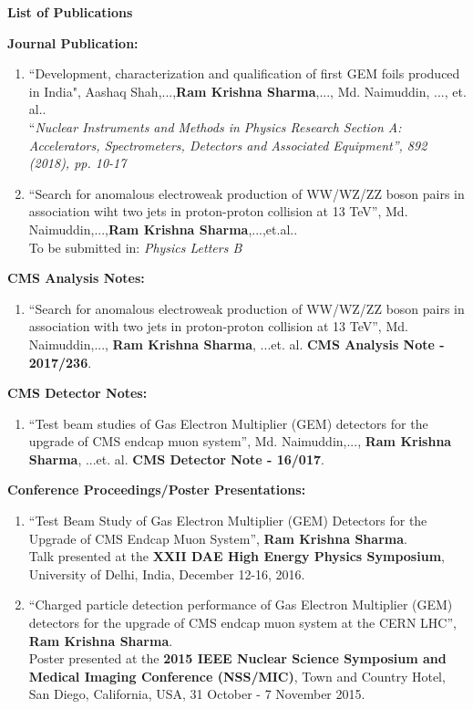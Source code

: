 \begin{center}
\doublespacing
{\LARGE \textbf{List of Publications}}
\end{center}
{\Large\textbf{Journal Publication:}}
\begin{enumerate}
\item ``Development, characterization and qualification of first GEM foils produced in India", Aashaq Shah,...,\textbf{Ram Krishna Sharma},..., Md. Naimuddin, ..., et. al..\\``\textit{Nuclear Instruments and Methods in Physics Research Section A: Accelerators, Spectrometers, Detectors and Associated Equipment'', 892 (2018), pp. 10-17}

\item ``Search for anomalous electroweak production of WW/WZ/ZZ boson pairs in association wiht two jets in proton-proton collision at 13 TeV'', Md. Naimuddin,...,\textbf{Ram Krishna Sharma},...,et.al..\\To be submitted in: \textit{Physics Letters B}
\end{enumerate}
%
\vspace{0.3cm}
%
{\Large \textbf{CMS Analysis Notes:}}
\begin{enumerate}
\item ``Search for anomalous electroweak production of WW/WZ/ZZ boson pairs in association with two jets in proton-proton collision at 13 TeV'', 
Md. Naimuddin,..., \textbf{Ram Krishna Sharma}, ...et. al. 
{\bf CMS Analysis Note - 2017/236}.
\end{enumerate}
%
\vspace{0.3cm}
{\Large \textbf{CMS Detector Notes:}}
\begin{enumerate}
\item ``Test beam studies of Gas Electron Multiplier (GEM) detectors for the upgrade of CMS endcap muon system'', Md. Naimuddin,..., \textbf{Ram Krishna Sharma}, ...et. al. {\bf CMS Detector Note - 16/017}.
\end{enumerate}
%
\vspace{0.3cm}
{\Large \textbf{Conference Proceedings/Poster Presentations:}}
\begin{enumerate}
	\item ``Test Beam Study of Gas Electron Multiplier (GEM) Detectors for the Upgrade of CMS Endcap Muon System'', {\textbf{Ram Krishna Sharma}}.\\
	Talk presented at the \textbf{XXII DAE High Energy Physics Symposium}, University of Delhi, India, December 12-16, 2016.

	\item ``Charged particle detection performance of Gas Electron Multiplier (GEM) detectors for the upgrade of CMS endcap muon system at the CERN LHC'', \textbf{Ram Krishna Sharma}.\\
	Poster presented at the \textbf{2015 IEEE Nuclear Science Symposium and Medical Imaging Conference (NSS/MIC)}, Town and Country Hotel, San Diego, California, USA, 31 October - 7 November 2015.
\end{enumerate}
